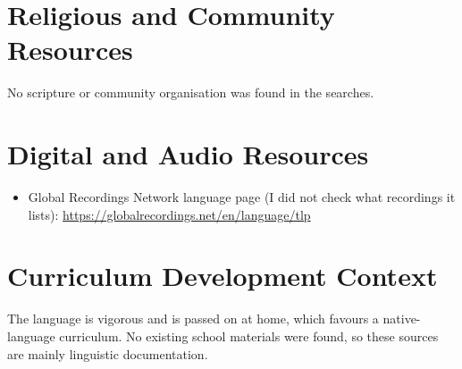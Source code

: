 \documentclass[12pt]{article}
\begin{document}
\section{Religious and Community Resources}
No scripture or community organisation was found in the searches.

\section{Digital and Audio Resources}
\begin{itemize}
\item Global Recordings Network language page (I did not check what recordings it lists): \url{https://globalrecordings.net/en/language/tlp}
\end{itemize}

\section{Curriculum Development Context}
The language is vigorous and is passed on at home, which favours a native-language curriculum. No existing school materials were found, so these sources are mainly linguistic documentation.
\end{document}
